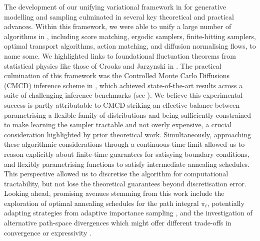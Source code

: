 The development of our unifying variational framework in  for generative modelling and sampling culminated in several key theoretical and practical advances. Within this framework, we were able to unify a large number of algorithms in , including score matching, ergodic samplers, finite-hitting samplers, optimal transport algorithms, action matching, and diffusion normalising flows, to name some. We highlighted links to foundational fluctuation theorems from statistical physics like those of Crooks and Jarzynski in . The practical culmination of this framework was the Controlled Monte Carlo Diffusions (CMCD) inference scheme in , which achieved state-of-the-art results across a suite of challenging inference benchmarks (see ). We believe this experimental success is partly attributable to CMCD striking an effective balance between parametrising a flexible family of distributions and being sufficiently constrained to make learning the sampler tractable and not overly expensive, a crucial consideration highlighted by prior theoretical work. Simultaneously, approaching these algorithmic considerations through a continuous-time limit allowed us to reason explicitly about finite-time guarantees for satisying boundary conditions, and flexibly parametrising functions to satisfy intermediate annealing schedules. This perspective allowed us to discretise the algorithm for computational tractability, but not lose the theoretical guarantees beyond discretisation error. Looking ahead, promising avenues stemming from this work include the exploration of optimal annealing schedules for the path integral \(\pi_t\), potentially adapting strategies from adaptive importance sampling \parencite{goshtasbpour2023adaptive}, and the investigation of alternative path-space divergences which might offer different trade-offs in convergence or expressivity \parencite{nusken2021solving, richter2023improved, midgley2022flow}.


